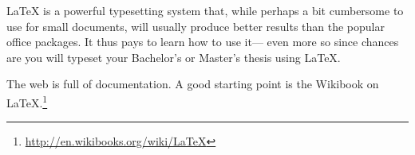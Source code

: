 \documentclass{acm_proc_article-sp}
\begin{document}
LaTeX is a powerful typesetting system that,
while perhaps a bit cumbersome to use for small documents,
will usually produce better results
than the popular office packages.
It thus pays to learn how to use it---%
even more so since chances are
you will typeset your Bachelor's or Master's thesis
using LaTeX.

The web is full of documentation.
A good starting point
is the Wikibook on LaTeX.\footnote{\url{http://en.wikibooks.org/wiki/LaTeX}}





\end{document}
